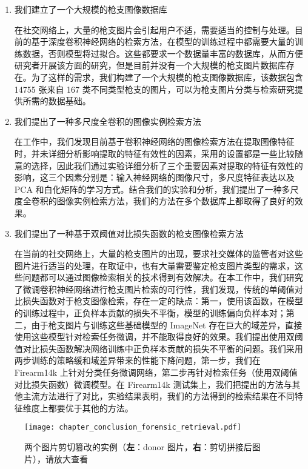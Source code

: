 \begin{enumerate}
\item 我们建立了一个大规模的枪支图像数据库

在社交网络上，大量的枪支图片会引起用户不适，需要适当的控制与处理。目前的基于深度卷积神经网络的检索方法，在模型的训练过程中都需要大量的训练数据，否则模型将过拟合。这些都要求一个数据量丰富的数据库，从而方便研究者开展该方面的研究，但是目前并没有一个大规模的枪支图片数据库存在。为了这样的需求，我们构建了一个大规模的枪支图像数据库，该数据包含 14755 张来自 167 类不同类型枪支的图片，可以为枪支图片分类与检索研究提供所需的数据基础。

\item  我们提出了一种多尺度全卷积的图像实例检索方法

在工作中，我们发现目前基于卷积神经网络的图像检索方法在提取图像特征时，并未详细分析影响提取的特征有效性的因素，采用的设置都是一些比较随意的选择，因此我们通过实验详细分析了三个重要因素对提取的特征有效性的影响，这三个因素分别是：输入神经网络的图像尺寸，多尺度特征表达以及 PCA 和白化矩阵的学习方式。结合我们的实验和分析，我们提出了一种多尺度全卷积的图像实例检索方法，我们的方法在多个数据库上都取得了良好的效果。

\item 我们提出了一种基于双阈值对比损失函数的枪支图像检索方法

在当前的社交网络上，大量的枪支图片的出现，要求社交媒体的监管者对这些图片进行适当的处理，在取证中，也有大量需要鉴定枪支图片类型的需求，这些问题都可以通过图像检索相关的技术得到有效解决。在本工作中，我们研究了微调卷积神经网络进行枪支图片检索的可行性，我们发现，传统的单阈值对比损失函数对于枪支图像检索，存在一定的缺点：第一，使用该函数，在模型的训练过程中，正负样本贡献的损失不平衡，模型的训练偏向负样本对；第二，由于枪支图片与训练这些基础模型的 ImageNet 存在巨大的域差异，直接使用这些模型针对检索任务微调，并不能取得良好的效果。我们提出使用双阈值对比损失函数解决网络训练中正负样本贡献的损失不平衡的问题。我们采用两步训练的策略缓和域差异带来的性能下降问题，第一步，我们在 Firearm14k 上针对分类任务微调网络，第二步再针对检索任务（使用双阈值对比损失函数）微调模型。在 Firearm14k 测试集上，我们把提出的方法与其他主流方法进行了对比，实验结果表明，我们的方法得到的检索结果在不同特征维度上都要优于其他的方法。
\end{enumerate}

\begin{figure}
\centering
\texttt{[image: chapter\_conclusion\_forensic\_retrieval.pdf]}
\caption[两个图片剪切篡改的实例]{两个图片剪切篡改的实例（\textbf{左}：donor 图片，\textbf{右}：剪切拼接后图片），请放大查看}
\label{fig:forensic_image_retrieval}
\end{figure}

